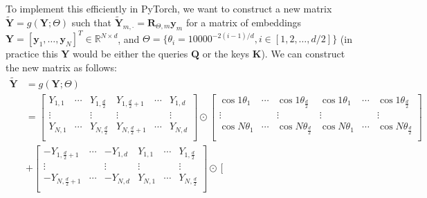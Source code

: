 \documentclass[11pt,addpoints,answers]{exam}
\newcommand{\Rb}{\mathbb{R}}
\newcommand{\yv}{\mathbf{y}}
\newcommand{\Kv}{\mathbf{K}}
\newcommand{\Qv}{\mathbf{Q}}
\newcommand{\Rv}{\mathbf{R}}
\newcommand{\Yv}{\mathbf{Y}}
\begin{document}
\begin{questions}
    To implement this efficiently in PyTorch, we want to construct a new matrix $\tilde{\Yv} = g(\Yv; \Theta)$ such that $\tilde{\Yv}_{m, \cdot} = \Rv_{\Theta,m} \yv_m$ for a matrix of embeddings $\Yv = [\yv_1, \ldots, \yv_N]^T \in \Rb^{N \times d}$, and $\Theta = \{\theta_i = 10000^{-2(i-1)/d}, i \in [1, 2, \ldots, d/2]\}$ (in practice this $\Yv$ would be either the queries $\Qv$ or the keys $\Kv$). We can construct the new matrix as follows:
    {\small 
    \begin{align*}
        \tilde{\Yv} &= g(\Yv; \Theta) \\
        &= \left[ \begin{array}{ccc|ccc} 
            Y_{1,1} & \cdots & Y_{1,\frac{d}{2}} & Y_{1,\frac{d}{2}+1} & \cdots & Y_{1,d} \\
            \vdots & & \vdots & \vdots & & \vdots \\
            Y_{N,1} & \cdots & Y_{N,\frac{d}{2}} & Y_{N,\frac{d}{2}+1} & \cdots & Y_{N,d} \\
        \end{array} \right] 
        \odot
        \left[ \begin{array}{ccc|ccc} 
            \cos 1 \theta_1 & \cdots & \cos 1 \theta_{\frac{d}{2}} & \cos 1 \theta_1 & \cdots & \cos 1 \theta_{\frac{d}{2}} \\
            \vdots & & \vdots & \vdots & & \vdots \\
            \cos N \theta_1 & \cdots & \cos N \theta_{\frac{d}{2}} & \cos N \theta_1 & \cdots & \cos N \theta_{\frac{d}{2}} \\
        \end{array} \right] 
        \\
        &+\left[ \begin{array}{ccc|ccc} 
            -Y_{1,\frac{d}{2}+1} & \cdots & -Y_{1,d} & Y_{1,1} & \cdots & Y_{1,\frac{d}{2}} \\
            \vdots & & \vdots & \vdots & & \vdots \\
            -Y_{N,\frac{d}{2}+1} & \cdots & -Y_{N,d} & Y_{N,1} & \cdots & Y_{N,\frac{d}{2}}  \\
        \end{array} \right] 
        \odot
        \left[ \begin{array}{ccc|ccc} 

\end{array}
\end{align*}}
\end{questions}
\end{document}

